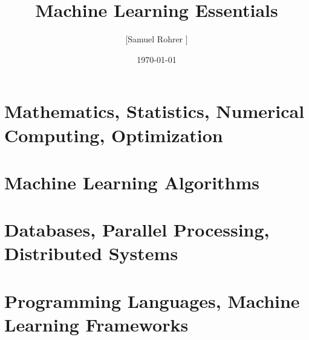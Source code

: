 \documentclass[12pt, oneside]{article}
\title{Machine Learning Essentials}
\author{[Samuel Rohrer \textcopyright]}
\date{\today}
\begin{document}
\maketitle
\tableofcontents

\newpage
\section{Mathematics, Statistics, Numerical Computing, Optimization}
\newpage


\newpage
\section{Machine Learning Algorithms}
\newpage


\newpage
\section{Databases, Parallel Processing, Distributed Systems}
\newpage


\newpage
\section{Programming Languages, Machine Learning Frameworks}
\newpage

\end{document}
